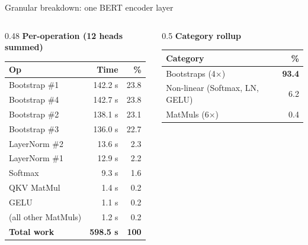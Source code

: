 \documentclass[aspectratio=169]{beamer}
\begin{document}
\begin{frame}{Granular breakdown: one BERT encoder layer}
  \scriptsize
  \begin{columns}[T]
    \begin{column}{0.48\textwidth}
      \textbf{Per-operation (12 heads summed)}
      \vspace{0.2em}
      \begin{tabular}{@{}lrr@{}}
        \toprule
        Op & Time & \% \\
        \midrule
        Bootstrap \#1 & 142.2 s & 23.8 \\
        Bootstrap \#4 & 142.7 s & 23.8 \\
        Bootstrap \#2 & 138.1 s & 23.1 \\
        Bootstrap \#3 & 136.0 s & 22.7 \\
        LayerNorm \#2 & \phantom{1}13.6 s & 2.3 \\
        LayerNorm \#1 & \phantom{1}12.9 s & 2.2 \\
        Softmax       & \phantom{10}9.3 s & 1.6 \\
        QKV MatMul    & \phantom{10}1.4 s & 0.2 \\
        GELU          & \phantom{10}1.1 s & 0.2 \\
        (all other MatMuls) & \phantom{100}1.2 s & 0.2 \\
        \midrule
        \textbf{Total work} & \textbf{598.5 s} & \textbf{100} \\
        \bottomrule
      \end{tabular}
    \end{column}
    \begin{column}{0.5\textwidth}
      \textbf{Category rollup}
      \vspace{0.4em}

      \begin{tabular}{@{}lr@{}}
        \toprule
        Category & \% \\
        \midrule
        Bootstraps (4$\times$)              & \textbf{93.4} \\
        Non-linear (Softmax, LN, GELU)      & 6.2 \\
        MatMuls (6$\times$)                 & 0.4 \\
        \bottomrule
      \end{tabular}


\end{column}
\end{columns}
\end{frame}
\end{document}
